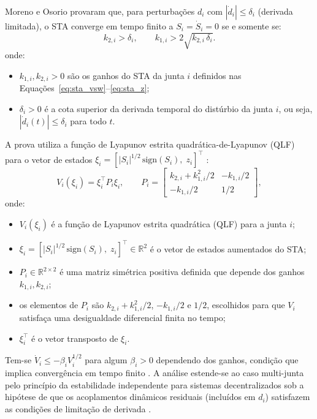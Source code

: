 Moreno e Osorio \cite{moreno2012strict} provaram que, para perturbações $d_i$ com $|\dot{d}_i| \leq \delta_i$ (derivada limitada), o STA converge em tempo finito a $S_i = \dot{S}_i = 0$ se e somente se:
\begin{equation}
    k_{2,i} > \delta_i, \qquad k_{1,i} > 2\sqrt{k_{2,i}\,\delta_i}.
    \label{eq:sta_conditions}
\end{equation}
onde:
\begin{itemize}
    \item $k_{1,i}, k_{2,i} > 0$ são os ganhos do STA da junta $i$ definidos nas Equações~\eqref{eq:sta_vsw}--\eqref{eq:sta_z};
    \item $\delta_i > 0$ é a cota superior da derivada temporal do distúrbio da junta $i$, ou seja, $|\dot{d}_i(t)| \leq \delta_i$ para todo $t$.
\end{itemize}

A prova utiliza a função de Lyapunov estrita quadrática-de-Lyapunov (QLF) para o vetor de estados $\xi_i = [|S_i|^{1/2}\,\text{sign}(S_i),\; z_i]^\top$ \cite{moreno2012strict}:
\begin{equation}
    V_i(\xi_i) = \xi_i^\top P_i \xi_i, \qquad P_i = \begin{bmatrix} k_{2,i} + k_{1,i}^2/2 & -k_{1,i}/2 \\ -k_{1,i}/2 & 1/2 \end{bmatrix},
    \label{eq:lyap_sta}
\end{equation}
onde:
\begin{itemize}
    \item $V_i(\xi_i)$ é a função de Lyapunov estrita quadrática (QLF) para a junta $i$;
    \item $\xi_i = [|S_i|^{1/2}\,\text{sign}(S_i),\; z_i]^\top \in \mathbb{R}^2$ é o vetor de estados aumentados do STA;
    \item $P_i \in \mathbb{R}^{2 \times 2}$ é uma matriz simétrica positiva definida que depende dos ganhos $k_{1,i}, k_{2,i}$;
    \item os elementos de $P_i$ são $k_{2,i} + k_{1,i}^2/2$, $-k_{1,i}/2$ e $1/2$, escolhidos para que $V_i$ satisfaça uma desigualdade diferencial finita no tempo;
    \item $\xi_i^\top$ é o vetor transposto de $\xi_i$.
\end{itemize}
Tem-se $\dot{V}_i \leq -\beta_i V_i^{1/2}$ para algum $\beta_i > 0$ dependendo dos ganhos, condição que implica convergência em tempo finito \cite{bhat2000finite, moreno2012strict}. A análise estende-se ao caso multi-junta pelo princípio da estabilidade independente para sistemas decentralizados sob a hipótese de que os acoplamentos dinâmicos residuais (incluídos em $d_i$) satisfazem as condições de limitação de derivada \cite{slotine1991applied, shtessel2014sliding}.

